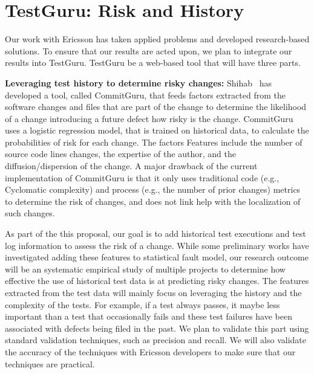 \section{TestGuru: Risk and History}

Our work with Ericsson has taken applied problems and developed research-based solutions. To ensure that our results are acted upon, we plan to integrate our results into TestGuru. TestGuru be a web-based tool that will have three parts. 

\textbf{Leveraging test history to determine risky changes:} Shihab~\cite{} has developed a tool, called CommitGuru, that feeds factors extracted from the software changes and files that are part of the change to determine the likelihood of a change introducing a future defect \ie how risky is the change. CommitGuru uses a logistic regression model, that is trained on historical data, to calculate the probabilities of risk for each change. The factors Features include the number of source code lines changes, the expertise of the author, and the diffusion/dispersion of the change. A major drawback of the current implementation of CommitGuru is that it only uses traditional code (e.g., Cyclomatic complexity) and process (e.g., the number of prior changes) metrics to determine the risk of changes, and does not link help with the localization of such changes.

As part of the this proposal, our goal is to add historical test executions and test log information to assess the risk of a change. While some preliminary works have investigated adding these features to statistical fault model\cite{herzig,others}, our research outcome will be an systematic empirical study of multiple projects to determine how effective the use of historical test data is at predicting risky changes. The features extracted from the test data will mainly focus on leveraging the history and the complexity of the tests. For example, if a test always passes, it maybe less important than a test that occasionally fails and these test failures have been associated with defects being filed in the past. We plan to validate this part using standard validation techniques, such as precision and recall. We will also validate the accuracy of the techniques with Ericsson developers to make sure that our techniques are practical.

